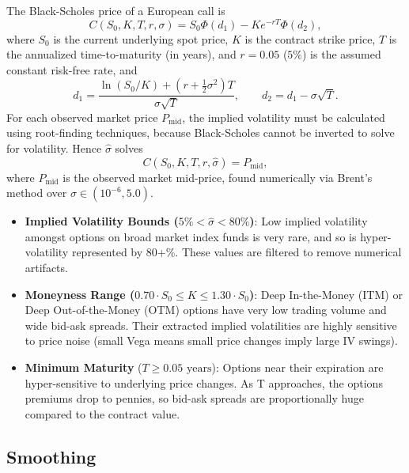 \documentclass[11pt]{article}
\begin{document}
The Black-Scholes price of a European call is
\begin{equation}
C(S_0, K, T, r, \sigma) = S_0 \Phi(d_1) - K e^{-rT} \Phi(d_2),
\end{equation}
where $S_0$ is the current underlying spot price, $K$ is the contract strike price, $T$ is the annualized time-to-maturity (in years), and $r = 0.05$ ($5\%$) is the assumed constant risk-free rate, and
\begin{equation}
d_1 = \frac{\ln(S_0/K) + (r + \tfrac{1}{2}\sigma^2)T}{\sigma\sqrt{T}}, \qquad
d_2 = d_1 - \sigma\sqrt{T}.
\end{equation}
For each observed market price $P_{\text{mid}}$, the implied volatility must be calculated using root-finding techniques, because Black-Scholes cannot be inverted to solve for volatility. Hence $\hat{\sigma}$ solves
\begin{equation}
C(S_0, K, T, r, \hat{\sigma}) = P_{\text{mid}},
\end{equation}
where $P_{\text{mid}}$ is the observed market mid-price, found numerically via Brent's method over $\sigma \in (10^{-6}, 5.0)$.
\begin{itemize}
    \item \textbf{Implied Volatility Bounds ($5\% < \hat{\sigma} < 80\%$)}: Low implied volatility amongst options on broad market index funds is very rare, and so is hyper-volatility represented by 80+\%. These values are filtered to remove numerical artifacts.
    \item \textbf{Moneyness Range ($0.70 \cdot S_0 \le K \le 1.30 \cdot S_0$)}: Deep In-the-Money (ITM) or Deep Out-of-the-Money (OTM) options have very low trading volume and wide bid-ask spreads. Their extracted implied volatilities are highly sensitive to price noise (small Vega means small price changes imply large IV swings). 
    \item \textbf{Minimum Maturity} ($T \ge 0.05\text{ years}$): Options near their expiration are hyper-sensitive to underlying price changes. As T approaches, the options premiums drop to pennies, so bid-ask spreads are proportionally huge compared to the contract value. 
\end{itemize}

\subsection{Smoothing}
\end{document}
